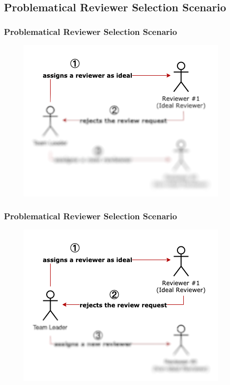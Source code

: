 \documentclass{beamer}
\begin{document}
\subsection{Problematical Reviewer Selection Scenario}
\begin{frame}
\frametitle{\large Problematical Reviewer Selection Scenario}
  \begin{figure}
    \includegraphics[scale=0.6]{img/gt_1.png}
    \end{figure}

\end{frame}
\begin{frame}
\frametitle{\large Problematical Reviewer Selection Scenario}
  \begin{figure}
    \includegraphics[scale=0.6]{img/gt_2.png}
    \end{figure}

\end{frame}
\end{document}
